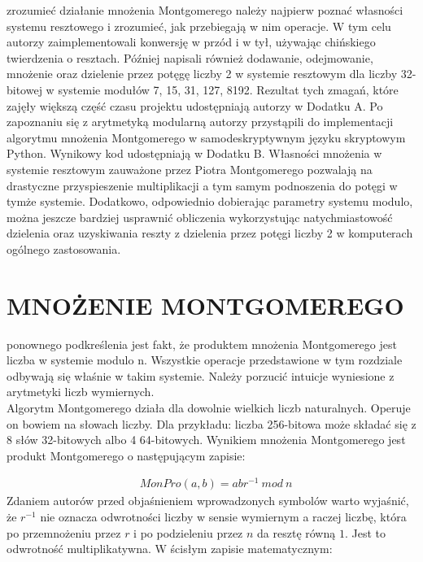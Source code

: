 \documentclass[10pt,journal,compsoc]{IEEEtran}
\begin{document}
 zrozumieć działanie mnożenia Montgomerego należy najpierw poznać własności systemu resztowego i zrozumieć, jak przebiegają w nim operacje. W tym celu autorzy zaimplementowali konwersję w przód i w tył, używając chińskiego twierdzenia o resztach. Później napisali również dodawanie, odejmowanie, mnożenie oraz dzielenie przez potęgę liczby 2 w systemie resztowym dla liczby 32-bitowej w systemie modułów 7, 15, 31, 127, 8192. Rezultat tych zmagań, które zajęły większą część czasu projektu udostępniają autorzy w Dodatku A. Po zapoznaniu się z arytmetyką modularną autorzy przystąpili do implementacji algorytmu mnożenia Montgomerego w samodeskryptywnym języku skryptowym Python. Wynikowy kod udostępniają w Dodatku B. Własności mnożenia w systemie resztowym zauważone przez Piotra Montgomerego pozwalają na drastyczne przyspieszenie multiplikacji a tym samym podnoszenia do potęgi w tymże systemie. Dodatkowo, odpowiednio dobierając parametry systemu modulo, można jeszcze bardziej usprawnić obliczenia wykorzystując natychmiastowość dzielenia oraz uzyskiwania reszty z dzielenia przez potęgi liczby 2 w komputerach ogólnego zastosowania.

\section{MNOŻENIE MONTGOMEREGO}
 ponownego podkreślenia jest fakt, że produktem mnożenia Montgomerego jest liczba w systemie modulo n. Wszystkie operacje przedstawione w tym rozdziale odbywają się właśnie w takim systemie. Należy porzucić intuicje wyniesione z arytmetyki liczb wymiernych.\\
Algorytm Montgomerego działa dla dowolnie wielkich liczb naturalnych. Operuje on bowiem na słowach liczby. Dla przykładu: liczba 256-bitowa może składać się z 8 słów 32-bitowych albo 4 64-bitowych. Wynikiem mnożenia Montgomerego jest produkt Montgomerego o następującym zapisie:

\begin{align*}
  &MonPro(a,b) = abr^{-1}\ mod\ n
\end{align*}
\noindent
Zdaniem autorów przed objaśnieniem wprowadzonych symbolów warto wyjaśnić, że $r^{-1}$ nie oznacza odwrotności liczby w sensie wymiernym a raczej liczbę, która po przemnożeniu przez $r$ i po podzieleniu przez $n$ da resztę równą $1$. Jest to odwrotność multiplikatywna. W ścisłym zapisie matematycznym:
\end{document}
